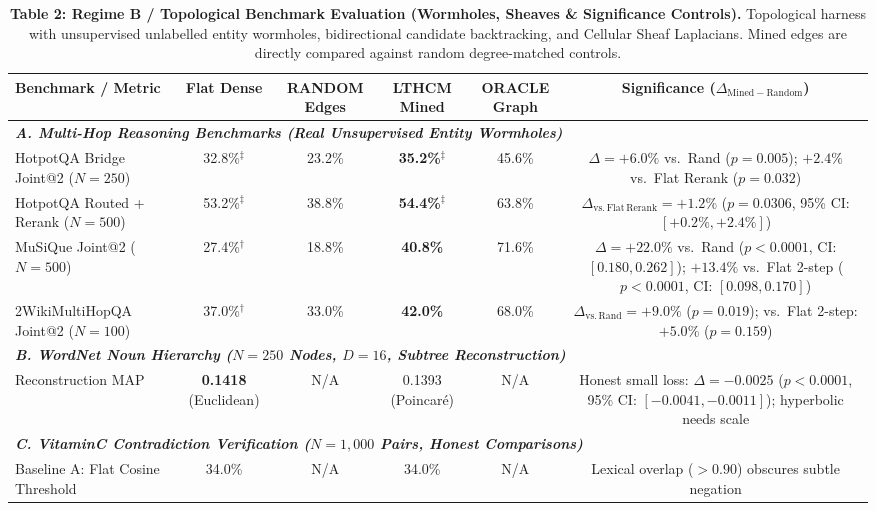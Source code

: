\documentclass[11pt,a4paper]{article}
\begin{document}
\begin{table}[t]
\centering
\small
\caption{\textbf{Table 2: Regime B / Topological Benchmark Evaluation (Wormholes, Sheaves \& Significance Controls).} Topological harness with unsupervised unlabelled entity wormholes, bidirectional candidate backtracking, and Cellular Sheaf Laplacians. Mined edges are directly compared against random degree-matched controls.}
\label{tab:fully_activated_results}
\vspace{0.5em}
\begin{tabular}{lccccc}
\toprule
\textbf{Benchmark / Metric} & \textbf{Flat Dense} & \textbf{RANDOM Edges} & \textbf{LTHCM Mined} & \textbf{ORACLE Graph} & \textbf{Significance ($\Delta_{\mathrm{Mined} - \mathrm{Random}}$)} \\
\midrule
\multicolumn{6}{l}{\textit{\textbf{A. Multi-Hop Reasoning Benchmarks (Real Unsupervised Entity Wormholes)}}} \\
HotpotQA Bridge Joint@2 ($N=250$) & 32.8\%$^\ddagger$ & 23.2\% & \textbf{35.2\%}$^\ddagger$ & 45.6\% & $\Delta = +6.0\%$ vs.\ Rand ($p = 0.005$); $+2.4\%$ vs.\ Flat Rerank ($p = 0.032$) \\
HotpotQA Routed + Rerank ($N=500$) & 53.2\%$^\ddagger$ & 38.8\% & \textbf{54.4\%}$^\ddagger$ & 63.8\% & $\Delta_{\mathrm{vs.\,Flat\,Rerank}} = +1.2\%$ ($p = 0.0306$, 95\% CI: $[+0.2\%, +2.4\%]$) \\
MuSiQue Joint@2 ($N=500$) & 27.4\%$^\dagger$ & 18.8\% & \textbf{40.8\%} & 71.6\% & $\Delta = +22.0\%$ vs.\ Rand ($p < 0.0001$, CI: $[0.180, 0.262]$); $+13.4\%$ vs.\ Flat 2-step ($p < 0.0001$, CI: $[0.098, 0.170]$) \\
2WikiMultiHopQA Joint@2 ($N=100$) & 37.0\%$^\dagger$ & 33.0\% & \textbf{42.0\%} & 68.0\% & $\Delta_{\mathrm{vs.\,Rand}} = +9.0\%$ ($p = 0.019$); vs.\ Flat 2-step: $+5.0\%$ ($p = 0.159$) \\
\midrule
\multicolumn{6}{l}{\textit{\textbf{B. WordNet Noun Hierarchy ($N=250$ Nodes, $D=16$, Subtree Reconstruction)}}} \\
Reconstruction MAP & \textbf{0.1418} (Euclidean) & N/A & 0.1393 (Poincaré) & N/A & Honest small loss: $\Delta = -0.0025$ ($p < 0.0001$, 95\% CI: $[-0.0041, -0.0011]$); hyperbolic needs scale \\
\midrule
\multicolumn{6}{l}{\textit{\textbf{C. VitaminC Contradiction Verification ($N=1,000$ Pairs, Honest Comparisons)}}} \\
Baseline A: Flat Cosine Threshold & 34.0\% & N/A & 34.0\% & N/A & Lexical overlap ($>0.90$) obscures subtle negation \\

\end{tabular}
\end{table}
\end{document}
